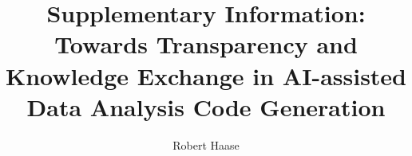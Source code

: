 \documentclass[sn-mathphys-num]{sn-jnl}%
\theoremstyle{thmstyleone}%
\theoremstyle{thmstyletwo}%
\theoremstyle{thmstylethree}%
\begin{document}
\title[Supplementary Information: Towards Transparency and Knowledge Exchange in AI-assisted Data Analysis Code Generation]{Supplementary Information: Towards Transparency and Knowledge Exchange in AI-assisted Data Analysis Code Generation}


\author[1,2]{Robert Haase}



\end{document}
